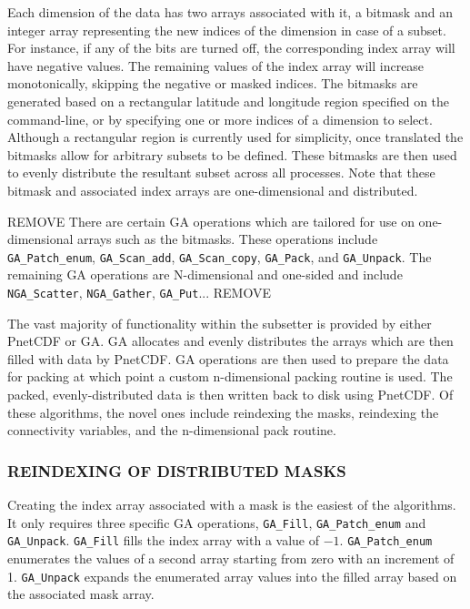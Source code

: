 Each dimension of the data has two arrays associated with it, a bitmask and an
integer array representing the new indices of the dimension in case of a
subset.  For instance, if any of the bits are turned off, the corresponding
index array will have negative values.  The remaining values of the index
array will increase monotonically, skipping the negative or masked indices.
The bitmasks are generated based on a rectangular latitude and longitude
region specified on the command-line, or by specifying one or more indices of
a dimension to select.  Although a rectangular region is currently used for
simplicity, once translated the bitmasks allow for arbitrary subsets to be
defined.  These bitmasks are then used to evenly distribute the resultant
subset across all processes.  Note that these bitmask and associated index
arrays are one-dimensional and distributed.

REMOVE
There are certain GA operations which are tailored for use on one-dimensional
arrays such as the bitmasks.  These operations include \verb=GA_Patch_enum=,
\verb=GA_Scan_add=, \verb=GA_Scan_copy=, \verb=GA_Pack=, and \verb=GA_Unpack=.
The remaining GA operations are N-dimensional and one-sided and include
\verb=NGA_Scatter=, \verb=NGA_Gather=, \verb=GA_Put=...
REMOVE

The vast majority of functionality within the subsetter is provided by either
PnetCDF or GA.  GA allocates and evenly distributes the arrays which are then
filled with data by PnetCDF.  GA operations are then used to prepare the data
for packing at which point a custom n-dimensional packing routine is used.
The packed, evenly-distributed data is then written back to disk using
PnetCDF.  Of these algorithms, the novel ones include reindexing the masks,
reindexing the connectivity variables, and the n-dimensional pack routine.

\subsubsection{REINDEXING OF DISTRIBUTED MASKS}

Creating the index array associated with a mask is the easiest of the
algorithms.  It only requires three specific GA operations, \verb=GA_Fill=,
\verb=GA_Patch_enum= and \verb=GA_Unpack=.  \verb=GA_Fill= fills the index
array with a value of $-1$.  \verb=GA_Patch_enum= enumerates the values of a
second array starting from zero with an increment of 1.  \verb=GA_Unpack=
expands the enumerated array values into the filled array based on the
associated mask array.

